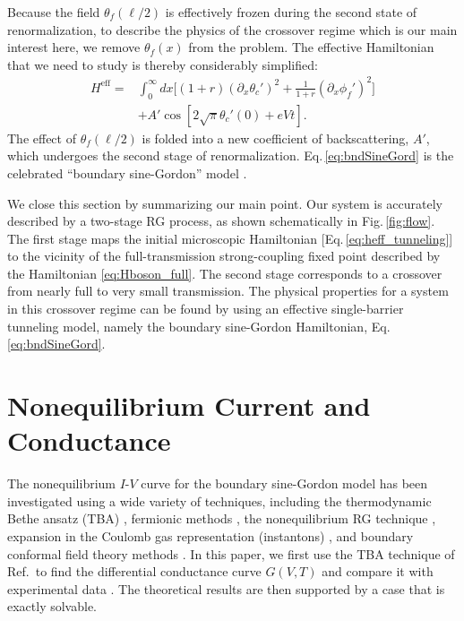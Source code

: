 \documentclass[aps,prb,reprint,floatfix,superscriptaddress,amssymb,amsmath]{revtex4-2}
\begin{document}
Because the field $\theta_f(\ell/2)$ is effectively frozen during the second state of renormalization, to describe the physics of the crossover regime which is our main interest here, we remove $\theta_f(x)$ from the problem. The effective Hamiltonian that we need to study is thereby considerably simplified:
\begin{equation}
\begin{aligned}
H^{\text{eff}} = & \int_0^{\infty} \!\!dx\Big[ (1 + r)(\partial_x \theta_c')^2 + \frac{1}{1+ r} (\partial_x \phi_f')^2\Big] \\[0.2cm]
& + A' \cos\!\left[2\sqrt{\pi} \theta_c'(0) + eVt\right].
\end{aligned} 
\label{eq:bndSineGord}
\end{equation}
The effect of $\theta_f(\ell/2)$ is folded into a new coefficient of backscattering, $A'$, which undergoes the second stage of renormalization. Eq.\,\eqref{eq:bndSineGord} is the celebrated ``boundary sine-Gordon'' model \cite{GiamarchiBook,GogolinBook}. 

We close this section by summarizing our main point. Our system is accurately described by a two-stage RG process, as shown schematically in Fig.\,\ref{fig:flow}. The first stage maps the initial microscopic Hamiltonian 
[Eq.\,\eqref{eq:heff_tunneling}] to the vicinity of the full-transmission strong-coupling fixed point described by the Hamiltonian \eqref{eq:Hboson_full}. The second stage corresponds to a crossover from nearly full to very small transmission. The physical properties for a system in this crossover regime can be found by using an effective single-barrier tunneling model, namely the boundary sine-Gordon Hamiltonian, Eq.\,\eqref{eq:bndSineGord}. 


\section{Nonequilibrium Current and Conductance}
\label{sec:I-V}

The nonequilibrium $I$-$V$ curve for the boundary sine-Gordon model has been investigated using a wide variety of techniques,
including the thermodynamic Bethe ansatz (TBA) \cite{FendleySaleurWarnerNPB94,FendleyPRL95,FendleyPRB95,FendleyUnifiedFrameJSP96}, fermionic methods \cite{AristovWoelflePRB14}, the nonequilibrium RG technique \cite{AristovWoelfle09}, expansion in the Coulomb gas representation (instantons) \cite{WeissBook}, and boundary conformal field theory methods \cite{GhoshalZam94,BazhanovNoneqSinGNPB99,Lukyanov_2007}. 
In this paper, we first use the TBA technique of Ref.\,\cite{FendleyPRB95} to find the differential conductance curve $G(V,T)$ and compare it with experimental data \cite{Mebrahtu13}. The theoretical results are then supported by a case that is exactly solvable.
\end{document}
